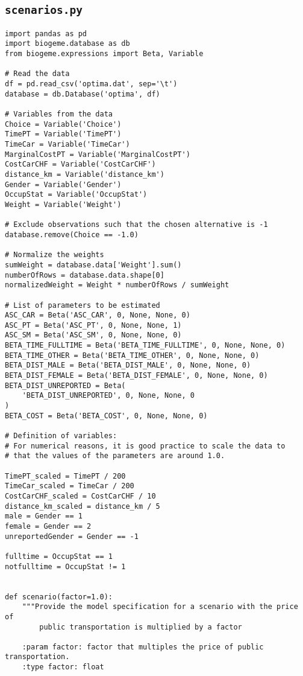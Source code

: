 \documentclass[12pt,a4paper]{article}
\begin{document}
\subsection{\lstinline$scenarios.py$}\label{sec:scenarios}
\begin{lstlisting}[style=numbers]
import pandas as pd
import biogeme.database as db
from biogeme.expressions import Beta, Variable

# Read the data
df = pd.read_csv('optima.dat', sep='\t')
database = db.Database('optima', df)

# Variables from the data
Choice = Variable('Choice')
TimePT = Variable('TimePT')
TimeCar = Variable('TimeCar')
MarginalCostPT = Variable('MarginalCostPT')
CostCarCHF = Variable('CostCarCHF')
distance_km = Variable('distance_km')
Gender = Variable('Gender')
OccupStat = Variable('OccupStat')
Weight = Variable('Weight')

# Exclude observations such that the chosen alternative is -1
database.remove(Choice == -1.0)

# Normalize the weights
sumWeight = database.data['Weight'].sum()
numberOfRows = database.data.shape[0]
normalizedWeight = Weight * numberOfRows / sumWeight

# List of parameters to be estimated
ASC_CAR = Beta('ASC_CAR', 0, None, None, 0)
ASC_PT = Beta('ASC_PT', 0, None, None, 1)
ASC_SM = Beta('ASC_SM', 0, None, None, 0)
BETA_TIME_FULLTIME = Beta('BETA_TIME_FULLTIME', 0, None, None, 0)
BETA_TIME_OTHER = Beta('BETA_TIME_OTHER', 0, None, None, 0)
BETA_DIST_MALE = Beta('BETA_DIST_MALE', 0, None, None, 0)
BETA_DIST_FEMALE = Beta('BETA_DIST_FEMALE', 0, None, None, 0)
BETA_DIST_UNREPORTED = Beta(
    'BETA_DIST_UNREPORTED', 0, None, None, 0
)
BETA_COST = Beta('BETA_COST', 0, None, None, 0)

# Definition of variables:
# For numerical reasons, it is good practice to scale the data to
# that the values of the parameters are around 1.0.

TimePT_scaled = TimePT / 200
TimeCar_scaled = TimeCar / 200
CostCarCHF_scaled = CostCarCHF / 10
distance_km_scaled = distance_km / 5
male = Gender == 1
female = Gender == 2
unreportedGender = Gender == -1

fulltime = OccupStat == 1
notfulltime = OccupStat != 1


def scenario(factor=1.0):
    """Provide the model specification for a scenario with the price of
        public transportation is multiplied by a factor

    :param factor: factor that multiples the price of public transportation.
    :type factor: float


\end{lstlisting}
\end{document}

